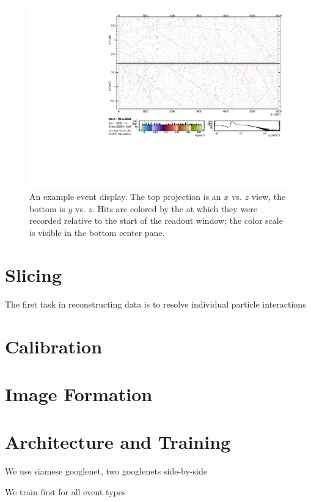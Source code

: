 \begin{figure}[t]
\begin{center}
\includegraphics[width=\textwidth]{figures/evd/evd_14db.pdf}
\end{center}
\caption{An example \nova event display.  The top projection is an $x$ vs. $z$ view, the bottom is $y$ vs. $z$.  Hits are colored by the at which they were recorded relative to the start of the readout window; the color scale is visible in the bottom center pane.}
\label{eventDisplay14}
\end{figure}

\section{Slicing}

The first task in reconstructing \nova data is to resolve individual particle interactions


\section{Calibration}


\section{Image Formation}

\section{Architecture and Training}

We use siamese googlenet, two googlenets side-by-side

We train first for all event types



